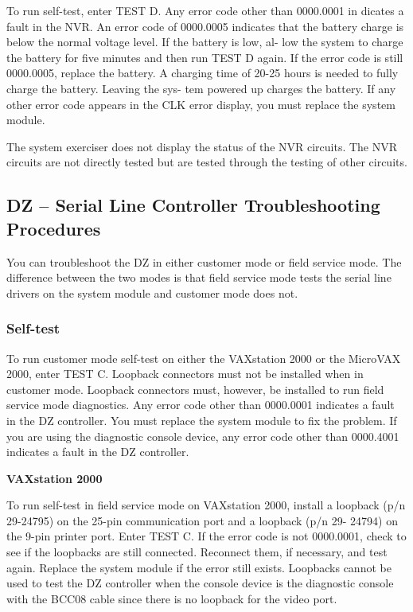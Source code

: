 To run self-test, enter TEST D. Any error code other than 0000.0001 in
dicates a fault in the NVR. An error code of 0000.0005 indicates that the
battery charge is below the normal voltage level. If the battery is low, al-
low the system to charge the battery for five minutes and then run TEST D
again. If the error code is still 0000.0005, replace the battery. A charging
time of 20-25 hours is needed to fully charge the battery. Leaving the sys-
tem powered up charges the battery. If any other error code appears in the
CLK error display, you must replace the system module.

The system exerciser does not display the status of the NVR circuits. The
NVR circuits are not directly tested but are tested through the testing of
other circuits.

\subsection{DZ -- Serial Line Controller Troubleshooting Procedures}

You can troubleshoot the DZ in either customer mode or field service mode.
The difference between the two modes is that field service mode tests the
serial line drivers on the system module and customer mode does not.

\subsubsection{Self-test}

To run customer mode self-test on either the VAXstation 2000 or the 
MicroVAX 2000, enter TEST C. Loopback connectors must not be installed
when in customer mode. Loopback connectors must, however, be installed
to run field service mode diagnostics. Any error code other than 0000.0001
indicates a fault in the DZ controller. You must replace the system module
to fix the problem. If you are using the diagnostic console device, any error
code other than 0000.4001 indicates a fault in the DZ controller.

\textbf{VAXstation 2000}

To run self-test in field service mode on VAXstation 2000, install a loopback
(p/n 29-24795) on the 25-pin communication port and a loopback (p/n 29-
24794) on the 9-pin printer port. Enter TEST C. If the error code is not
0000.0001, check to see if the loopbacks are still connected. Reconnect
them, if necessary, and test again. Replace the system module if the error
still exists. Loopbacks cannot be used to test the DZ controller when the
console device is the diagnostic console with the BCC08 cable since there
is no loopback for the video port.

